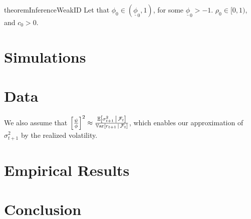 \documentclass[11pt, letterpaper, twoside, final]{article}
\begin{document}
\begin{restatable}{theorem}{InferenceWeakID}
    Let that $\phi_0  \in (\underline{\phi}_0,1)$, for some $\underline{\phi}_0 > -1$. 
    $\rho_0 \in [0,1)$, and $c_0 > 0$. 

\end{restatable}


\section{Simulations}

\section{Data}\label{sec:data}

We also assume that $\left[ \frac{\psi}{\phi} \right]^2 \approx \frac{\operatorname{\mathbb{E}} \left[\sigma^2_{t+1} \,\middle\vert\,
\mathcal{F}_t\right]}{\operatorname{\mathbb{V}ar}\left[r_{t+1} \,\middle\vert\, \mathcal{F}_t\right]}$, which enables our approximation of $\sigma^2_{t+1}$ by the
realized volatility.

\section{Empirical Results}

\section{Conclusion}

\clearpage

{}
\printbibliography
\clearpage
\end{document}
